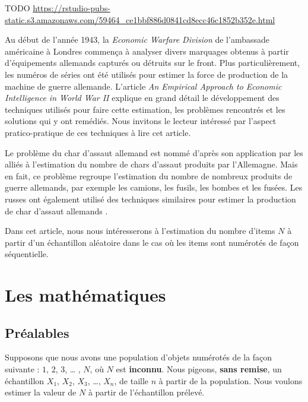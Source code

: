 \documentclass[10pt]{article}
\begin{document}
TODO
\url{https://rstudio-pubs-static.s3.amazonaws.com/59464_ce1bbf886d0841cd8ecc46c1852b352e.html}

Au début de l'année 1943, la \emph{Economic Warfare Division} de
l'ambassade américaine à Londres commença à analyser divers marquages
obtenus à partir d'équipements allemands capturés ou détruits sur le
front. Plus particulièrement, les numéros de séries ont été utilisés
pour estimer la force de production de la machine de guerre allemande.
L'article \emph{An Empirical Approach to Economic Intelligence in World
War II} \cite{Ruggles1947} explique en grand détail le développement des
techniques utilisés pour faire cette estimation, les problèmes
rencontrés et les solutions qui y ont remédiés. Nous invitons le lecteur
intéressé par l'aspect pratico-pratique de ces techniques à lire cet
article.

Le problème du char d'assaut allemand est nommé d'après son application
par les alliés à l'estimation du nombre de chars d'assaut produits par
l'Allemagne. Mais en fait, ce problème regroupe l'estimation du nombre
de nombreux produits de guerre allemands, par exemple les camions, les
fusils, les bombes et les fusées. Les russes ont également utilisé des
techniques similaires pour estimer la production de char d'assaut
allemands \cite{Volz2008}.

Dans cet article, nous nous intéresserons à l'estimation du nombre
d'items \(N\) à partir d'un échantillon aléatoire dans le cas où les
items sont numérotés de façon séquentielle.

\hypertarget{les-mathematiques}{%
\section{\texorpdfstring{Les mathématiques
\label{maths}}{Les mathématiques }}\label{les-mathematiques}}

\hypertarget{prealables}{%
\subsection{Préalables}\label{prealables}}

Supposons que nous avons une population d'objets numérotés de la façon
suivante : \(1\), \(2\), \(3\), \ldots{} , \(N\), où \(N\) est
\textbf{inconnu}. Nous pigeons, \textbf{\textbf{sans remise}}, un
échantillon \(X_1\), \(X_2\), \(X_3\), \ldots{}, \(X_n\), de taille
\(n\) à partir de la population. Nous voulons estimer la valeur de \(N\)
à partir de l'échantillon prélevé.
\end{document}
